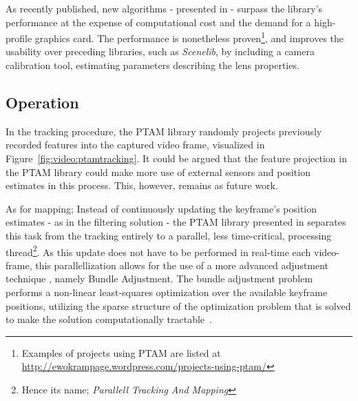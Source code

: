         As recently published, new algorithms - presented in \citep{Newcombe2011} - surpass
        the library's performance at the expense of computational cost
        and the demand for a high-profile graphics card.
        The performance is nonetheless proven\footnote{Examples of projects using PTAM are listed at \url{http://ewokrampage.wordpress.com/projects-using-ptam/}},
        and improves the usability over preceding libraries, such as \textit{Scenelib}, by including
        a camera calibration tool, estimating parameters describing the lens properties.

        \subsection{Operation}
            In the tracking procedure, the PTAM library randomly projects previously recorded features into the
            captured video frame, visualized in Figure~\ref{fig:video:ptamtracking}. It could be argued that the feature projection in the PTAM library
            could make more use of external sensors and position estimates in this process.
            This, however, remains as future work.

            As for mapping; Instead of continuously updating the keyframe's position estimates - as in the filtering solution -
            the PTAM library presented in \citep{klein07parallel} separates
            this task from the tracking entirely to a parallel, less time-critical, processing thread\footnote{Hence its name; \textit{Parallell Tracking And Mapping}}.
            As this update does not have to be performed in real-time each video-frame, this parallellization
            allows for the use of a more advanced adjustment technique \citep{klein07parallel}, namely
            Bundle Adjustment\citep{lour09}. The bundle adjustment problem
            performs a non-linear least-squares optimization over the available keyframe
            positions, utilizing the sparse structure of the optimization problem that
            is solved to make the solution computationally tractable~\citep{Lourakis11bundle}.

